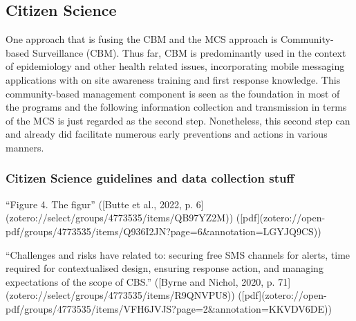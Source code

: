 \subsection{Citizen Science}

One approach that is fusing the CBM and the MCS approach is Community-based Surveillance (CBM). Thus far, CBM is predominantly used in the context of epidemiology and other health related issues, incorporating mobile messaging applications with on site awareness training and first response knowledge. This community-based management component is seen as the foundation in most of the programs and the following information collection and transmission in terms of the MCS is just regarded as the second step. Nonetheless, this second step can and already did facilitate numerous early preventions and actions in various manners.

\subsubsection{Citizen Science guidelines and data collection stuff} %
“Figure 4. The figur” ([Butte et al., 2022, p. 6](zotero://select/groups/4773535/items/QB97YZ2M)) ([pdf](zotero://open-pdf/groups/4773535/items/Q936I2JN?page=6&annotation=LGYJQ9CS))



“Challenges and risks have related to: securing free SMS channels for alerts, time required for contextualised design, ensuring response action, and managing expectations of the scope of CBS.” ([Byrne and Nichol, 2020, p. 71](zotero://select/groups/4773535/items/R9QNVPU8)) ([pdf](zotero://open-pdf/groups/4773535/items/VFH6JVJS?page=2&annotation=KKVDV6DE))



